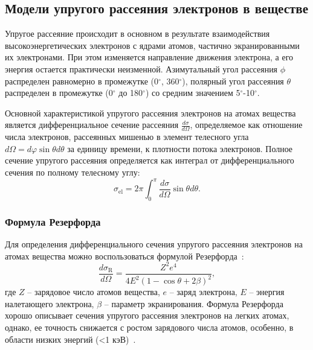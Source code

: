 \subsection{Модели упругого рассеяния электронов в веществе}
Упругое рассеяние происходит в основном в результате взаимодействия высокоэнергетических электронов с ядрами атомов, частично экранированными их электронами. При этом изменяется направление движения электрона, а его энергия остается практически неизменной. Азимутальный угол рассеяния $\phi$ распределен равномерно в промежутке (0$^\circ$, 360$^\circ$), полярный угол рассеяния $\theta$ распределен в промежутке (0$^\circ$ до 180$^\circ$) со средним значением 5$^\circ$-10$^\circ$.

Основной характеристикой упругого рассеяния электронов на атомах вещества является дифференциальное сечение рассеяния $\frac{d \sigma}{d \Omega}$, определяемое как отношение числа электронов, рассеянных мишенью в элемент телесного угла $d \Omega = d \varphi \sin \theta d \theta$ за единицу времени, к плотности потока электронов. Полное сечение упругого рассеяния определяется как интеграл от дифференциального сечения по полному телесному углу:
\begin{equation} \label{eq:models_1}
	\sigma_\mathrm{el}=2 \pi \int_0^\pi \frac{d \sigma}{d \Omega} \sin \theta d \theta.
\end{equation}

\subsubsection{Формула Резерфорда}
Для определения дифференциального сечения упругого рассеяния электронов на атомах вещества можно воспользоваться формулой Резерфорда~\cite{Dapor_large_book}:
\begin{equation} \label{eq:models_3}
	\frac{d \sigma_\mathrm{R}}{d \Omega}=\frac{Z^2 e^4}{4 E^2(1-\cos \theta+2 \beta)^2},
\end{equation}
где $Z$ -- зарядовое число атомов вещества, $e$ -- заряд электрона, $E$ -- энергия налетающего электрона, $\beta$ -- параметр экранирования. Формула Резерфорда хорошо описывает сечения упругого рассеяния электронов на легких атомах, однако, ее точность снижается с ростом зарядового числа атомов, особенно, в области низких энергий (<1 кэВ)~\cite{Dapor_large_book}.

